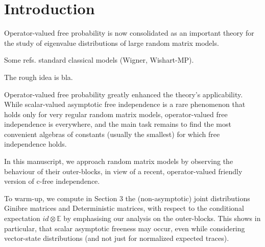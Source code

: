 \documentclass[ECP]{ejpecp} %
\begin{document}


\section{Introduction}

Operator-valued free probability is now consolidated as an important theory for the study of eigenvalue distributions of large random matrix models.

Some refs. \cite{Voi91} standard classical models (Wigner, Wishart-MP).

The rough idea is bla.

Operator-valued free probability \cite{Voi95} greatly enhanced the theory's applicability. While scalar-valued asymptotic free independence is a rare phenomenon that holds only for very regular random matrix models, operator-valued free independence is everywhere, and the main task remains to find the most convenient algebras of constants (usually the smallest) for which free independence holds. 

In this manuscript, we approach random matrix models by observing the behaviour of their outer-blocks, in view of a recent, operator-valued friendly version of c-free independence.

To warm-up, we compute in Section 3 the (non-asymptotic) joint distributions Ginibre matrices and Deterministic matrices, with respect to the conditional expectation $id\otimes \mathbb E$ by emphasising our analysis on the outer-blocks. This shows in particular, that scalar asymptotic freeness may occur, even while considering vector-state distributions (and not just for normalized expected traces).
\end{document}
